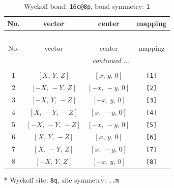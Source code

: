 \documentclass[fleqn,8pt]{jsarticle}
\begin{document}
\renewcommand{\arraystretch}{1.2}
\begin{longtable}{cccc}
\caption{Wyckoff bond: {\tt 16c@8p}, bond symmetry: {\tt 1}}
 \\
 \hline \hline
No. & vector & center & mapping \\ \hline \endfirsthead

\multicolumn{3}{l}{\tablename\ \thetable{}} \\
 \hline \hline
No. & vector & center & mapping \\ \hline \endhead

 \hline \hline
\multicolumn{3}{r}{\footnotesize\it continued ...} \\ \endfoot

 \hline \hline
\multicolumn{3}{r}{} \\ \endlastfoot

1 & $\left[ X,\, Y,\, Z \right]$ & $\left[ x,\, y,\, 0 \right]$ & {\tt [1]} \\ \hline
2 & $\left[ - X,\, - Y,\, Z \right]$ & $\left[ - x,\, - y,\, 0 \right]$ & {\tt [2]} \\ \hline
3 & $\left[ - X,\, Y,\, - Z \right]$ & $\left[ - x,\, y,\, 0 \right]$ & {\tt [3]} \\ \hline
4 & $\left[ X,\, - Y,\, - Z \right]$ & $\left[ x,\, - y,\, 0 \right]$ & {\tt [4]} \\ \hline
5 & $\left[ - X,\, - Y,\, - Z \right]$ & $\left[ - x,\, - y,\, 0 \right]$ & {\tt [5]} \\ \hline
6 & $\left[ X,\, Y,\, - Z \right]$ & $\left[ x,\, y,\, 0 \right]$ & {\tt [6]} \\ \hline
7 & $\left[ X,\, - Y,\, Z \right]$ & $\left[ x,\, - y,\, 0 \right]$ & {\tt [7]} \\ \hline
8 & $\left[ - X,\, Y,\, Z \right]$ & $\left[ - x,\, y,\, 0 \right]$ & {\tt [8]} \\
\end{longtable}
* Wyckoff site: {\tt 8q}, site symmetry: {\tt ..m}
\renewcommand{\arraystretch}{1.2}
\end{document}

